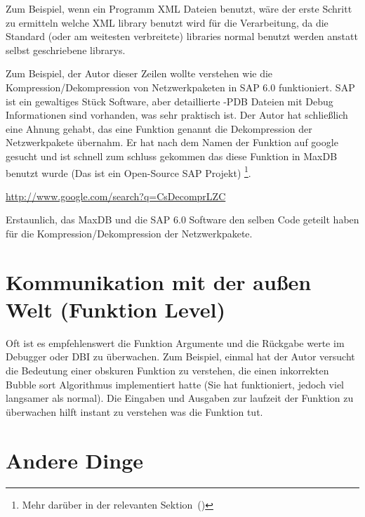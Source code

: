 Zum Beispiel, wenn ein Programm XML Dateien benutzt, w\"are der erste Schritt zu ermitteln welche
XML library benutzt wird f\"ur die Verarbeitung, da die Standard (oder am weitesten verbreitete) libraries
normal benutzt werden anstatt selbst geschriebene librarys.


Zum Beispiel, der Autor dieser Zeilen wollte verstehen wie die Kompression/Dekompression von Netzwerkpaketen in SAP 6.0 funktioniert.
SAP ist ein gewaltiges St\"uck Software, aber detaillierte -\gls{PDB} Dateien mit Debug Informationen sind vorhanden, was sehr praktisch 
ist. Der Autor hat schließlich eine Ahnung gehabt, das eine Funktion genannt  die Dekompression der Netzwerkpakete \"ubernahm.
Er hat nach dem Namen der Funktion auf google gesucht und ist schnell zum schluss gekommen das diese Funktion in 
MaxDB benutzt wurde (Das ist ein Open-Source SAP Projekt) \footnote{Mehr dar\"uber in der relevanten Sektion~()}. 

\url{http://www.google.com/search?q=CsDecomprLZC}

Erstaunlich, das MaxDB und die SAP 6.0 Software den selben Code geteilt haben f\"ur die Kompression/Dekompression der Netzwerkpakete.

 

\section{Kommunikation mit der außen Welt (Funktion Level)} 
Oft ist es empfehlenswert die Funktion Argumente und die R\"uckgabe werte im Debugger oder \ac{DBI} zu \"uberwachen.
Zum Beispiel, einmal hat der Autor versucht die Bedeutung einer obskuren Funktion zu verstehen, die einen inkorrekten
Bubble sort Algorithmus implementiert hatte (Sie hat funktioniert, jedoch viel langsamer als normal). Die Eingaben und Ausgaben zur laufzeit 
der Funktion zu \"uberwachen hilft instant zu verstehen was die Funktion tut.









\section{Andere Dinge}

